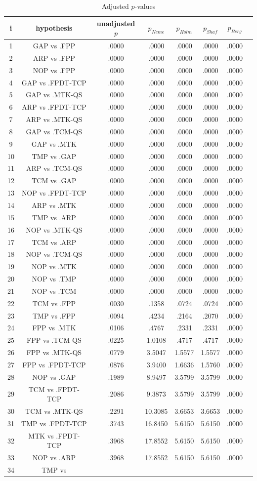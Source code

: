\documentclass[a4paper,10pt]{article}
\begin{document}
\begin{landscape}
\begin{table}[!htp]
\centering\tiny
\caption{Adjusted $p$-values}
\begin{tabular}{cccccccc}
i&hypothesis&unadjusted $p$&$p_{Neme}$&$p_{Holm}$&$p_{Shaf}$&$p_{Berg}$\\
\hline
1&GAP vs .FPP&.0000&.0000&.0000&.0000&.0000\\2&ARP vs .FPP&.0000&.0000&.0000&.0000&.0000\\3&NOP vs .FPP&.0000&.0000&.0000&.0000&.0000\\4&GAP vs .FPDT-TCP&.0000&.0000&.0000&.0000&.0000\\5&GAP vs .MTK-QS&.0000&.0000&.0000&.0000&.0000\\6&ARP vs .FPDT-TCP&.0000&.0000&.0000&.0000&.0000\\7&ARP vs .MTK-QS&.0000&.0000&.0000&.0000&.0000\\8&GAP vs .TCM-QS&.0000&.0000&.0000&.0000&.0000\\9&GAP vs .MTK&.0000&.0000&.0000&.0000&.0000\\10&TMP vs .GAP&.0000&.0000&.0000&.0000&.0000\\11&ARP vs .TCM-QS&.0000&.0000&.0000&.0000&.0000\\12&TCM vs .GAP&.0000&.0000&.0000&.0000&.0000\\13&NOP vs .FPDT-TCP&.0000&.0000&.0000&.0000&.0000\\14&ARP vs .MTK&.0000&.0000&.0000&.0000&.0000\\15&TMP vs .ARP&.0000&.0000&.0000&.0000&.0000\\16&NOP vs .MTK-QS&.0000&.0000&.0000&.0000&.0000\\17&TCM vs .ARP&.0000&.0000&.0000&.0000&.0000\\18&NOP vs .TCM-QS&.0000&.0000&.0000&.0000&.0000\\19&NOP vs .MTK&.0000&.0000&.0000&.0000&.0000\\20&NOP vs .TMP&.0000&.0000&.0000&.0000&.0000\\21&NOP vs .TCM&.0000&.0000&.0000&.0000&.0000\\22&TCM vs .FPP&.0030&.1358&.0724&.0724&.0000\\23&TMP vs .FPP&.0094&.4234&.2164&.2070&.0000\\24&FPP vs .MTK&.0106&.4767&.2331&.2331&.0000\\25&FPP vs .TCM-QS&.0225&1.0108&.4717&.4717&.0000\\26&FPP vs .MTK-QS&.0779&3.5047&1.5577&1.5577&.0000\\27&FPP vs .FPDT-TCP&.0876&3.9400&1.6636&1.5760&.0000\\28&NOP vs .GAP&.1989&8.9497&3.5799&3.5799&.0000\\29&TCM vs .FPDT-TCP&.2086&9.3873&3.5799&3.5799&.0000\\30&TCM vs .MTK-QS&.2291&10.3085&3.6653&3.6653&.0000\\31&TMP vs .FPDT-TCP&.3743&16.8450&5.6150&5.6150&.0000\\32&MTK vs .FPDT-TCP&.3968&17.8552&5.6150&5.6150&.0000\\33&NOP vs .ARP&.3968&17.8552&5.6150&5.6150&.0000\\34&TMP vs 
\end{tabular}
\end{table}
\end{landscape}
\end{document}
